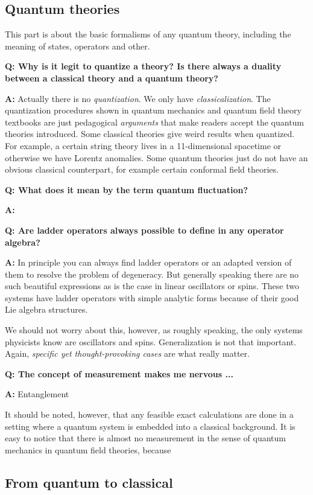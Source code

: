\documentclass[hyperref, a4paper]{article}
\newcommand*{\concept}[1]{{\textbf{#1}}}
\newenvironment{qanda}{\setlength{\parindent}{0pt}}{\bigskip}
\newcommand{\Q}{\bigskip\bfseries Q: }
\newcommand{\A}{\par\textbf{A:} \normalfont}
\begin{document}
\subsection{Quantum theories}

This part is about the basic formalisms of any quantum theory, including the meaning of states, operators and other.

\begin{qanda}

\Q Why is it legit to quantize a theory? Is there always a duality between a classical theory and a quantum theory?
\A Actually there is no \emph{quantization}. We only have \emph{classicalization}. The quantization procedures shown in quantum mechanics and quantum field theory textbooks are just pedagogical \emph{arguments} that make readers accept the quantum theories introduced.
Some classical theories give weird results when quantized. For example, a certain string theory lives in a 11-dimensional spacetime or otherwise we have Lorentz anomalies.
Some quantum theories just do not have an obvious classical counterpart, for example certain conformal field theories.

\Q What does it mean by the term \concept{quantum fluctuation}?
\A 

\Q Are ladder operators always possible to define in any operator algebra?
\A In principle you can always find ladder operators or an adapted version of them to resolve the problem of degeneracy.
But generally speaking there are no such beautiful expressions as is the case in linear oscillators or spins.
These two systems have ladder operators with simple analytic forms because of their good Lie algebra structures.

We should not worry about this, however, as roughly speaking, the only systems physicists know are oscillators and spins.
Generalization is not that important. Again, \emph{specific yet thought-provoking cases} are what really matter.

\Q The concept of measurement makes me nervous ...
\A Entanglement

It should be noted, however, that any feasible exact calculations are done in a setting where a quantum system is embedded into a classical background.
It is easy to notice that there is almost no measurement in the sense of quantum mechanics in quantum field theories, because 

\end{qanda}

\subsection{From quantum to classical}
\end{document}
